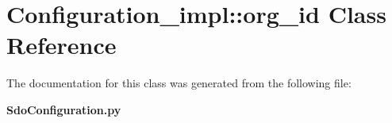 \section{Configuration\_\-impl::org\_\-id Class Reference}
\label{classConfiguration__impl_1_1org__id}


The documentation for this class was generated from the following file:\begin{CompactItemize}
\item 
{\bf Sdo\-Configuration.py}\end{CompactItemize}
